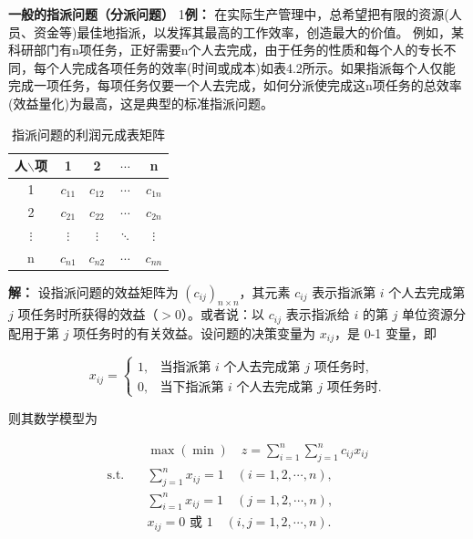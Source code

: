     \begin{exbox}{\textbf{一般的指派问题（分派问题）}}
        1\textbf{例：} 在实际生产管理中，总希望把有限的资源(人员、资金等)最佳地指派，以发挥其最高的工作效率，创造最大的价值。
        例如，某科研部门有n项任务，正好需要n个人去完成，由于任务的性质和每个人的专长不同，每个人完成各项任务的效率(时间或成本)如表4.2所示。如果指派每个人仅能完成一项任务，每项任务仅要一个人去完成，如何分派使完成这n项任务的总效率(效益量化)为最高，这是典型的标准指派问题。
        \begin{table}[H]
            \centering
            \label{tab:4-2}
            \renewcommand{\arraystretch}{1.5}
            \begin{tabular}{|c|c|c|c|c|}
                \hline
                人$\backslash$项 & 1 & 2 & $\cdots$ & n \\
                \hline
                1 & $c_{11}$ & $c_{12}$ & $\cdots$ & $c_{1n}$ \\
                \hline
                2 & $c_{21}$ & $c_{22}$ & $\cdots$ & $c_{2n}$ \\
                \hline
                $\vdots$ & $\vdots$ & $\vdots$ & $\ddots$ & $\vdots$ \\
                \hline
                n & $c_{n1}$ & $c_{n2}$ & $\cdots$ & $c_{nn}$ \\
                \hline
            \end{tabular}
            \caption{指派问题的利润元成表矩阵}
        \end{table}
        
        \textbf{解：} 设指派问题的效益矩阵为 $(c_{ij})_{n \times n}$，其元素 $c_{ij}$ 表示指派第 $i$ 个人去完成第 $j$ 项任务时所获得的效益（$>0$）。或者说：以 $c_{ij}$ 表示指派给 $i$ 的第 $j$ 单位资源分配用于第 $j$ 项任务时的有关效益。设问题的决策变量为 $x_{ij}$，是 0-1 变量，即
        
        \begin{center}
        \begin{equation*}
        x_{ij} = 
        \begin{cases} 
        1, & \text{当指派第 $i$ 个人去完成第 $j$ 项任务时}, \\
        0, & \text{当下指派第 $i$ 个人去完成第 $j$ 项任务时}.
        \end{cases}
        \end{equation*}
        \end{center}
        
        则其数学模型为
        
        \begin{align*}
        &\max (\min) \quad z = \sum_{i=1}^n \sum_{j=1}^n c_{ij} x_{ij} \\
        \text{s.t.} \quad & \sum_{j=1}^n x_{ij} = 1 \quad (i=1, 2, \cdots, n), \tag*{第 $i$ 个人做成一项任务} \\
        & \sum_{i=1}^n x_{ij} = 1 \quad (j=1, 2, \cdots, n), \tag*{第 $j$ 项任务只能由一个人完成} \\
        & x_{ij} = 0 \text{ 或 } 1 \quad (i, j=1, 2, \cdots, n).
        \end{align*}
        \end{exbox}

